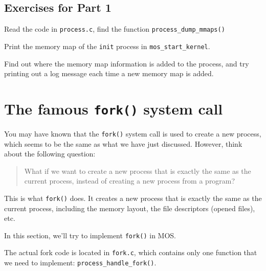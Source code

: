 \subsection{Exercises for Part 1}

\begin{exercise}
    \item Read the code in \texttt{process.c}, find the function \texttt{process\_dump\_mmaps()}
    \item Print the memory map of the \texttt{init} process in \texttt{mos\_start\_kernel}.
    \item Find out where the memory map information is added to the process, and try
    printing out a log message each time a new memory map is added.
\end{exercise}

\section{The famous \texttt{fork()} system call}

You may have known that the \texttt{fork()} system call is used to create a new process, which
seems to be the same as what we have just discussed. However, think about the following
question:

\begin{quote}
    What if we want to create a new process that is exactly the same as the current process,
    instead of creating a new process from a program?
\end{quote}

This is what \texttt{fork()} does. It creates a new process that is exactly the same as the
current process, including the memory layout, the file descriptors (opened files), etc.

In this section, we'll try to implement \texttt{fork()} in MOS.

The actual fork code is located in \texttt{fork.c}, which contains only one function
that we need to implement: \texttt{process\_handle\_fork()}.

